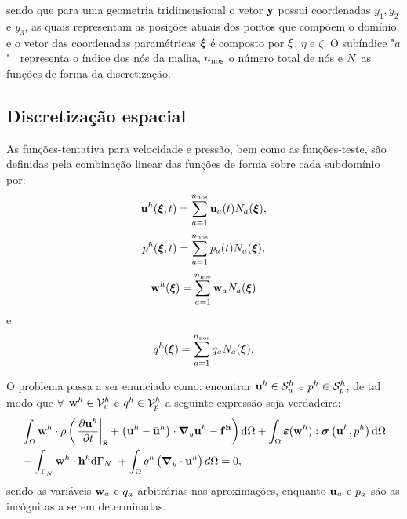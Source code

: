 \noindent sendo que para uma geometria tridimensional o vetor $\mathbf{y}$ possui coordenadas $y_1,y_2$ e $y_3$, as quais representam as posições atuais dos pontos que compõem o domínio, e o vetor das coordenadas paramétricas $\bm{\xi}$ é composto por $\xi$, $\eta$ e $\zeta$.  O subíndice "$a$" $ \ $ representa o índice dos nós da malha, $n_{\mathrm{nos}}$ o número total de nós e $N$ as funções de forma da discretização.


\subsection{Discretização espacial} \label{capitulo:Cap2:DiscEspacial}

As funções-tentativa para velocidade e pressão, bem como as funções-teste, são definidas pela combinação linear das funções de forma sobre cada subdomínio por:
\begin{align}
	\mathbf{u}^h(\boldsymbol{\xi},t) = \sum_{a = 1}^{n_{\mathrm{nos}}} \mathbf{u}_{a}(t)N_{a}(\boldsymbol{\xi}), \label{eq:interp_vel}
\end{align}
\begin{align}
	p^h(\boldsymbol{\xi},t)  = \sum_{a = 1}^{n_{\mathrm{nos}}} p_{a}(t)N_{a}(\boldsymbol{\xi}),\label{eq:interp_press} 
\end{align}
\begin{align}
	\mathbf{w}^h(\boldsymbol{\xi})  = \sum_{a = 1}^{n_{\mathrm{nos}}} \mathbf{w}_{a}N_{a}(\boldsymbol{\xi}) \label{eq:interp_utest}
\end{align}
\noindent e
\begin{align}
	q^h(\boldsymbol{\xi})  = \sum_{a = 1}^{n_{\mathrm{nos}}} q_{a}N_{a}(\boldsymbol{\xi}). \label{eq:inter_ptest} 
\end{align}

O problema passa a ser enunciado como: encontrar $\mathbf{u}^h \in \mathcal{S}_u^h$ e $p^h \in \mathcal{S}_p^h$, de tal modo que $\forall$ $\mathbf{w}^h \in \mathcal{V}_u^h$ e $q^h \in \mathcal{V}_p^h$ a seguinte expressão seja verdadeira:
\begin{align}
	\begin{split}
		&\int_{\Omega} \mathbf{w}^h \cdot \rho \left(\left. \frac{\partial\mathbf{u}^h}{\partial t} \right|_{\bar{\mathbf{x}}} + \left(\mathbf{u}^h - \bar{\mathbf{u}}^h \right)\cdot\boldsymbol{\nabla}_y \mathbf{u}^h - \mathbf{f^h} \right) \mathrm{d} \Omega + \int_{\Omega} \bm{\varepsilon}(\mathbf{w}^h) : \boldsymbol{\sigma}\left(\mathbf{u}^h,p^h \right)  \mathrm{d} \Omega\\ & - \int_{\Gamma_{N}} \mathbf{w}^h \cdot \mathbf{h}^{h} \mathrm{d} \Gamma_{N} \ + \int_{\Omega} q^h \left(\boldsymbol{\nabla}_y \cdot \mathbf{u}^h\right) d \Omega = 0,  \label{eq:QM_C_forma_fraca_1} 
	\end{split}
\end{align}
\noindent sendo as variáveis $\mathbf{w}_{a}$ e $q_{a}$ arbitrárias nas aproximações, enquanto $\mathbf{u}_{a}$ e $p_{a}$ são as incógnitas a serem determinadas.


